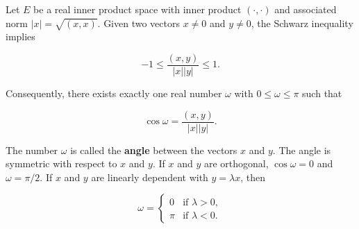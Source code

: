 Let $E$ be a real inner product space with inner product $(\cdot, \cdot)$ and associated norm $|x| = \sqrt{(x, x)}$. Given two vectors $x \neq 0$ and $y \neq 0$, the Schwarz inequality implies

$$-1 \leq \frac{(x, y)}{|x| |y|} \leq 1.$$

Consequently, there exists exactly one real number $\omega$ with $0 \leq \omega \leq \pi$ such that

$$\cos \omega = \frac{(x, y)}{|x| |y|}.$$

The number $\omega$ is called the \textbf{angle} between the vectors $x$ and $y$. The angle is symmetric with respect to $x$ and $y$. If $x$ and $y$ are orthogonal, $\cos \omega = 0$ and $\omega = \pi/2$. If $x$ and $y$ are linearly dependent with $y = \lambda x$, then

$$\omega = \begin{cases} 0 & \text{if } \lambda > 0, \\ \pi & \text{if } \lambda < 0. \end{cases}$$
